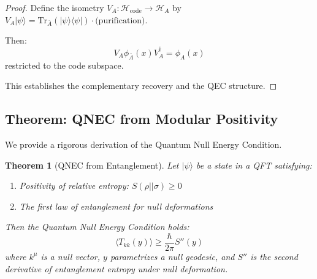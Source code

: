 \documentclass[12pt,a4paper]{article}
\newtheorem{theorem}{Theorem}[section]
\begin{document}
\begin{proof}
Define the isometry $V_A: \mathcal{H}_{\text{code}} \to \mathcal{H}_A$ by $V_A|\psi\rangle = \text{Tr}_{\bar{A}}(|\psi\rangle\langle\psi|) \cdot \text{(purification)}$.

Then:
\begin{equation}
V_A \phi_{\bar{A}}(x) V_A^\dagger = \phi_A(x)
\end{equation}
restricted to the code subspace.

This establishes the complementary recovery and the QEC structure.
\end{proof}

\subsection{Theorem: QNEC from Modular Positivity}

We provide a rigorous derivation of the Quantum Null Energy Condition.

\begin{theorem}[QNEC from Entanglement]\label{thm:qnec}
Let $|\psi\rangle$ be a state in a QFT satisfying:
\begin{enumerate}
    \item Positivity of relative entropy: $S(\rho||\sigma) \geq 0$
    \item The first law of entanglement for null deformations
\end{enumerate}
Then the Quantum Null Energy Condition holds:
\begin{equation}
\langle T_{kk}(y) \rangle \geq \frac{\hbar}{2\pi} S''(y)
\end{equation}
where $k^\mu$ is a null vector, $y$ parametrizes a null geodesic, and $S''$ is the second derivative of entanglement entropy under null deformation.
\end{theorem}
\end{document}
